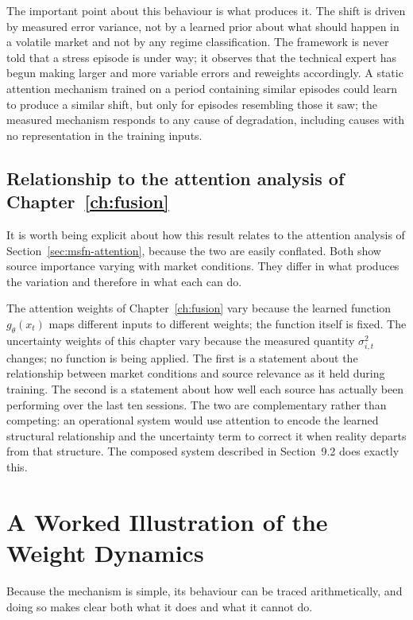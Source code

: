 The important point about this behaviour is what produces it. The shift is driven by measured
error variance, not by a learned prior about what should happen in a volatile market and not by
any regime classification. The framework is never told that a stress episode is under way; it
observes that the technical expert has begun making larger and more variable errors and reweights
accordingly. A static attention mechanism trained on a period containing similar episodes could
learn to produce a similar shift, but only for episodes resembling those it saw; the measured
mechanism responds to any cause of degradation, including causes with no representation in the
training inputs.

\subsection{Relationship to the attention analysis of Chapter~\ref{ch:fusion}}
\label{sec:dyn-relattn}

It is worth being explicit about how this result relates to the attention analysis of
Section~\ref{sec:msfn-attention}, because the two are easily conflated. Both show source
importance varying with market conditions. They differ in what produces the variation and
therefore in what each can do.

The attention weights of Chapter~\ref{ch:fusion} vary because the learned function
$g_\theta(x_t)$ maps different inputs to different weights; the function itself is fixed. The
uncertainty weights of this chapter vary because the measured quantity $\sigma_{i,t}^2$ changes;
no function is being applied. The first is a statement about the relationship between market
conditions and source relevance as it held during training. The second is a statement about how
well each source has actually been performing over the last ten sessions. The two are
complementary rather than competing: an operational system would use attention to encode the
learned structural relationship and the uncertainty term to correct it when reality departs from
that structure. The composed system described in Section~9.2 does exactly this.

\section{A Worked Illustration of the Weight Dynamics}
\label{sec:dyn-worked}

Because the mechanism is simple, its behaviour can be traced arithmetically, and doing so makes
clear both what it does and what it cannot do.

